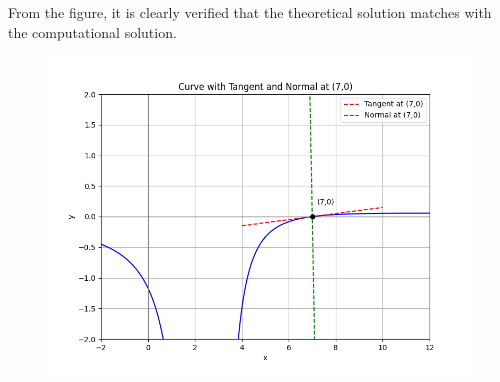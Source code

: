 \documentclass[journal]{IEEEtran}
\begin{document}
From the figure, it is clearly verified that the theoretical solution matches with the computational solution.\\

\begin{figure}[H]
    \centering
    \includegraphics[width=0.8\columnwidth]{figs/Figure_1.png}
    \label{fig:1}
\end{figure}
\end{document}

